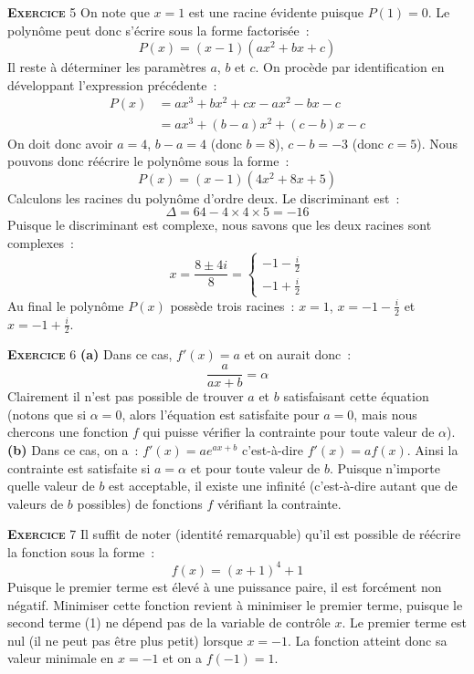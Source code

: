 \documentclass[10pt,a4paper,notitlepage]{article}
\newcommand{\exercice}[1]{\textsc{\textbf{Exercice}} #1}
\begin{document}
\bigskip

\exercice{5} On note que $x=1$ est une racine évidente puisque $P(1)=0$. Le polynôme peut donc s'écrire sous la forme factorisée :
\[
P(x) = (x-1)(ax^2+bx+c)
\]
Il reste à déterminer les paramètres $a$, $b$ et $c$. On procède par identification en développant l'expression précédente :
\[
  \begin{split}
    P(x) &= ax^3+bx^2+cx-ax^2-bx-c\\
    &= ax^3 +(b-a)x^2+(c-b)x-c
  \end{split}
\]
On doit donc avoir $a=4$, $b-a=4$ (donc $b=8$), $c-b=-3$ (donc $c=5$). Nous pouvons donc réécrire le polynôme sous la forme :
\[
P(x) = (x-1)(4x^2+8x+5)
\]
Calculons les racines du polynôme d'ordre deux. Le discriminant est :
\[
\Delta = 64-4 \times 4 \times 5 = -16
\]
Puisque le discriminant est complexe, nous savons que les deux racines sont complexes :
\[
  x = \frac{8 \pm 4i}{8} =
  \begin{cases}
    -1-\frac{i}{2}\\
    -1+\frac{i}{2}
  \end{cases}
\]
Au final le polynôme $P(x)$ possède trois racines : $x=1$, $x=-1-\frac{i}{2}$ et $x=-1+\frac{i}{2}$.

\bigskip

\exercice{6} \textbf{(a)} Dans ce cas, $f'(x)=a$ et on aurait donc :
\[
\frac{a}{ax+b} = \alpha
\]
Clairement il n'est pas possible de trouver $a$ et $b$ satisfaisant
cette équation (notons que si $\alpha=0$, alors l'équation est
satisfaite pour $a=0$, mais nous chercons une fonction $f$ qui puisse
vérifier la contrainte pour toute valeur de $\alpha$). \textbf{(b)}
Dans ce cas, on a : $f'(x) = a e^{ax+b}$ c'est-à-dire
$f'(x) = a f(x)$. Ainsi la contrainte est satisfaite si $a=\alpha$ et
pour toute valeur de $b$. Puisque n'importe quelle valeur de $b$ est
acceptable, il existe une infinité (c'est-à-dire autant que de valeurs
de $b$ possibles) de fonctions $f$ vérifiant la contrainte.

\bigskip

\exercice{7} Il suffit de noter (identité remarquable) qu'il est possible de réécrire la fonction sous la forme :
\[
f(x) = (x+1)^{4}+1
\]
Puisque le premier terme est élevé à une puissance paire, il est
forcément non négatif. Minimiser cette fonction revient à minimiser le
premier terme, puisque le second terme (1) ne dépend pas de la
variable de contrôle $x$. Le premier terme est nul (il ne peut pas
être plus petit) lorsque $x=-1$. La fonction atteint donc sa valeur
minimale en $x=-1$ et on a $f(-1)=1$.
\end{document}
